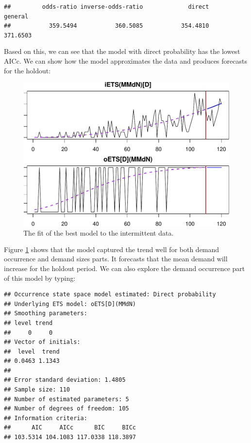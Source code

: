 \documentclass[
]{book}
\newenvironment{Shaded}{\begin{snugshade}}{\end{snugshade}}
\newcommand{\NormalTok}[1]{#1}
\newcommand{\SpecialCharTok}[1]{\textcolor[rgb]{0.00,0.00,0.00}{#1}}
\theoremstyle{definition}
\theoremstyle{definition}
\theoremstyle{definition}
\theoremstyle{definition}
\theoremstyle{remark}
\begin{document}
\begin{verbatim}
##         odds-ratio inverse-odds-ratio             direct            general 
##           359.5494           360.5085           354.4810           371.6503
\end{verbatim}

Based on this, we can see that the model with direct probability has the lowest AICc. We can show how the model approximates the data and produces forecasts for the holdout:

\begin{figure}
\centering
\includegraphics{Svetunkov--2022----ADAM_files/figure-latex/adamModelsiETSBest-1.pdf}
\caption{\label{fig:adamModelsiETSBest}The fit of the best model to the intermittent data.}
\end{figure}

Figure \ref{fig:adamModelsiETSBest} shows that the model captured the trend well for both demand occurrence and demand sizes parts. It forecasts that the mean demand will increase for the holdout period. We can also explore the demand occurrence part of this model by typing:

\begin{Shaded}
\end{Shaded}

\begin{verbatim}
## Occurrence state space model estimated: Direct probability
## Underlying ETS model: oETS[D](MMdN)
## Smoothing parameters:
## level trend 
##     0     0 
## Vector of initials:
##  level  trend 
## 0.0463 1.1343 
## 
## Error standard deviation: 1.4805
## Sample size: 110
## Number of estimated parameters: 5
## Number of degrees of freedom: 105
## Information criteria: 
##      AIC     AICc      BIC     BICc 
## 103.5314 104.1083 117.0338 118.3897
\end{verbatim}
\end{document}
